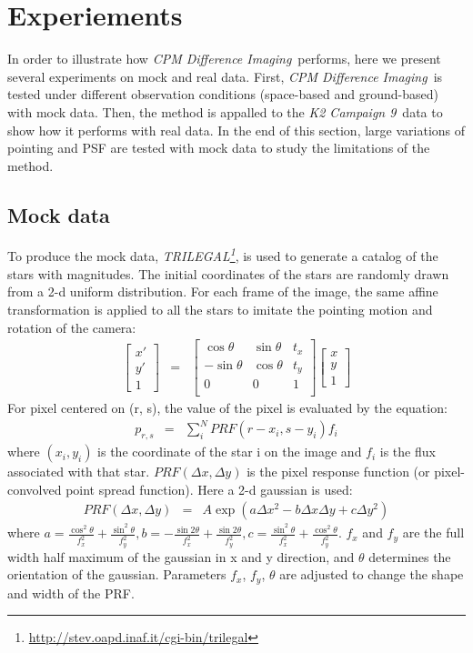\documentclass[12pt, preprint]{aastex}
\newcommand{\project}[1]{\textsl{#1}}
\newcommand{\cpmdiff}{\project{CPM Difference Imaging}}
\newcommand{\KTCN}{\project{K2 Campaign 9}}
\begin{document}
\section{Experiements}
In order to illustrate how \cpmdiff\ performs, here we present several experiments on mock and real data. 
First, \cpmdiff\ is tested under different observation conditions (space-based and ground-based) with mock data. 
Then,  the method is appalled to the \KTCN\ data to show how it performs with real data. 
In the end of this section,  large variations of pointing and PSF are tested with mock data to study the limitations of the method.

\subsection{Mock data}
To produce the mock data, \project{TRILEGAL\footnote{\url{http://stev.oapd.inaf.it/cgi-bin/trilegal}}}, \cite{TRILEGAL}  is used to generate a catalog of the stars with magnitudes. 
The initial coordinates of the stars are randomly drawn from a 2-d uniform distribution. 
For each frame of the image, the same affine transformation is applied  to all the stars to imitate the pointing motion and rotation of the camera:
\begin{eqnarray}\label{transformation}
\begin{bmatrix}
    x' \\
    y' \\
    1
\end{bmatrix}
&=&
\begin{bmatrix}
    \cos \theta & \sin \theta & t_x \\
    -\sin \theta & \cos \theta & t_y \\
    0 & 0 & 1 \\
\end{bmatrix}
\begin{bmatrix}
    x \\
    y \\
    1
\end{bmatrix}
\end{eqnarray}
For pixel centered on (r, s), the value of the pixel is evaluated by the equation:
\begin{eqnarray}
p_{r,s} &=& \sum_{i}^{N} PRF(r-x_i, s-y_i) f_i
\end{eqnarray}
where $(x_i,y_i)$ is the coordinate of the star i on the image and $f_i$ is the flux associated with that star. 
$PRF(\Delta x, \Delta y)$ is the pixel response function (or pixel-convolved point spread function). 
Here a 2-d gaussian is used:
\begin{eqnarray} \label{prf}
PRF(\Delta x, \Delta y) &=& A \exp(a\Delta x^2-b\Delta x \Delta y+c\Delta y^2) 
\end{eqnarray}
where $a={\frac {\cos ^{2}\theta }{f_{x}^{2}}}+{\frac {\sin ^{2}\theta }{f_{y}^{2}}}, b=-{\frac {\sin 2\theta }{f_{x}^{2}}}+{\frac {\sin 2\theta }{f_{y}^{2}}}, c={\frac {\sin ^{2}\theta }{f_{x}^{2}}}+{\frac {\cos ^{2}\theta }{f_{y}^{2}}}$.
$f_x$ and $f_y$ are the full width half maximum of the gaussian in x and y direction, and $\theta$ determines the orientation of the gaussian.
Parameters $f_x$, $f_y$, $\theta$ are adjusted to change the shape and width of the PRF.
\end{document}
